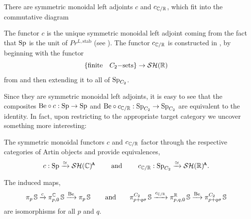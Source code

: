 \begin{rec} \label{rec:c}
  There are symmetric monoidal left adjoints $c$ and $c_{\mathbb{C}/\mathbb{R}}$,
  which fit into the commutative diagram
  \begin{center}
  \end{center}

  The functor $c$ is the unique symmetric monoidal left adjoint coming from the fact that $\operatorname{\mathrm{Sp}}$ is the unit of $Pr^{L, \mathrm{stab}}$ (see ).
  The functor $c_{\mathbb{C}/\mathbb{R}}$ is constructed in \cite{HellerOrmsby}, by beginning with the functor
  \[ \left\{ \mathrm{finite} \ \ \  C_2\mathrm{-sets} \right\} \to \mathcal{SH}(\mathbb{R}) \]
  from  and then extending it to all of $\operatorname{\mathrm{Sp}}_{C_2}$.
\end{rec}

Since they are symmetric monoidal left adjoints, it is easy to see that the composites $\mathrm{Be} \circ c : \operatorname{\mathrm{Sp}} \to \operatorname{\mathrm{Sp}}$ and $\mathrm{Be} \circ c_{\mathbb{C}/\mathbb{R}} : \operatorname{\mathrm{Sp}}_{C_2} \to \operatorname{\mathrm{Sp}}_{C_2}$ are equivalent to the identity. In fact, upon restricting to the appropriate target category we uncover something more interesting:

\begin{thm} \label{thm:c-ff}
  The symmetric monoidal functors $c$ and $c_{\mathbb{C}/\mathbb{R}}$ factor through the respective categories of Artin objects and provide equivalences,
  \[ c : \Sp \xrightarrow{\simeq} \SHCa \qquad \text{ and } \qquad c_{\C/\R} : \Sp_{C_2} \xrightarrow{\simeq} \SHRa. \]
\end{thm}

\begin{cor} \label{cor:betti-iso}
  The induced maps,
  \[ \pi_p\operatorname{\mathbb{S}} \xrightarrow{c} \pi^{\mathbb{C}} _{p,0}\operatorname{\mathbb{S}} \xrightarrow{\mathrm{Be}} \pi_p\operatorname{\mathbb{S}}  \qquad \text{and} \qquad \pi^{C_2}_{p+q\sigma}\operatorname{\mathbb{S}} \xrightarrow{c_{\mathbb{C}/\mathbb{R}}} \pi^{\mathbb{R}} _{p,q,0}\operatorname{\mathbb{S}} \xrightarrow{\mathrm{Be}} \pi^{C_2} _{p+q\sigma}\operatorname{\mathbb{S}} \]
  are isomorphisms for all $p$ and $q$.
\end{cor}

